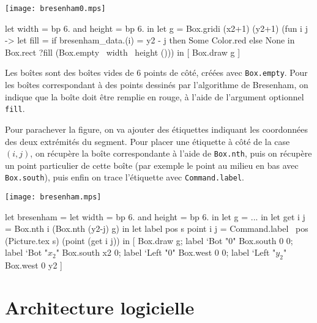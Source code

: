 \documentclass[twoside]{studia-Hermann}
\begin{document}
\medskip
\begin{minipage}{0.3\linewidth}
  \texttt{[image: bresenham0.mps]}
\end{minipage}
\begin{minipage}{0.7\linewidth}
\vspace*{0.8em}
\begin{ocaml}
let width = bp 6. and height = bp 6. in
let g = Box.gridi (x2+1) (y2+1) 
  (fun i j -> 
    let fill = if bresenham_data.(i) = y2 - j 
               then Some Color.red else None in
    Box.rect ?fill (Box.empty ~width ~height ())) in
[ Box.draw g ]
\end{ocaml}
\end{minipage}

\medskip\noindent Les boîtes sont des boîtes vides de 6 points de
côté, créées avec \texttt{Box.empty}. Pour les boîtes correspondant à
des points dessinés par l'algorithme de Bresenham, on indique que la
boîte doit être remplie en rouge, à l'aide de l'argument optionnel
\texttt{fill}. 

Pour parachever la figure, on va ajouter des étiquettes indiquant les
coordonnées des deux extrémités du segment. Pour placer une étiquette
à côté de la case $(i,j)$, on récupère la boîte correspondante à
l'aide de \texttt{Box.nth}, puis on récupère un point particulier de
cette boîte (par exemple le point au milieu en bas avec
\texttt{Box.south}), puis enfin on trace l'étiquette avec
\texttt{Command.label}.

\medskip
\begin{minipage}{0.22\linewidth}
\vspace*{0.8em}
\hspace*{-1.4em}\texttt{[image: bresenham.mps]}
\end{minipage}
\begin{minipage}{0.7\linewidth}\small
\begin{ocaml}
let bresenham = 
  let width = bp 6. and height = bp 6. in
  let g = ... in
  let get i j = Box.nth i (Box.nth (y2-j) g) in
  let label pos s point i j =
    Command.label ~pos (Picture.tex s) (point (get i j)) in
  [ Box.draw g;
    label `Bot "0" Box.south 0 0; label `Bot "$x_2$" Box.south x2 0;
    label `Left "0" Box.west 0 0; label `Left "$y_2$" Box.west 0 y2 ]
\end{ocaml}
\end{minipage}

\section{Architecture logicielle}\label{archi}
\end{document}

